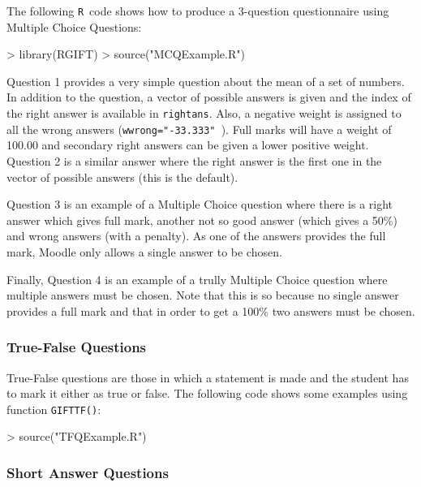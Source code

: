 \documentclass[a4paper]{article}
\newcommand{\RR}{\texttt{R}\ }
\newcommand{\code}[1]{\texttt{#1}}
\begin{document}
The following \RR code shows how to produce a 3-question questionnaire
using Multiple Choice Questions:



\begin{Schunk}
\begin{Sinput}
> library(RGIFT)
> source("MCQExample.R")
\end{Sinput}
\end{Schunk}

Question 1 provides a very simple question about the mean of a set of numbers.
In addition to the question, a vector of possible answers is given and the
index of the right answer is available in \code{rightans}. Also, a negative
weight is assigned to all the wrong answers (\code{wwrong="-33.333" }).
Full marks will have a weight of 100.00 and secondary right answers
can be given a lower positive weight.
Question 2 is a similar answer where the right answer is the first one in the
vector of possible answers (this is the default).  

Question 3 is an example of a Multiple Choice question where there is a right
answer which gives full mark, another not so good answer (which gives a 50\%)
and wrong answers (with a penalty).  As one of the answers provides the full
mark, Moodle only allows a single answer to be chosen.

Finally, Question 4 is an example of a trully Multiple Choice question where
multiple answers must be chosen. Note that this is so because no single answer
provides a full mark and that in order to get a 100\% two answers must be
chosen.

\subsubsection{True-False Questions}

True-False questions are those in which a statement is made and the student has
to mark it either as true or false. The following code shows some examples
using function \code{GIFTTF()}:


\begin{Schunk}
\begin{Sinput}
> source("TFQExample.R")
\end{Sinput}
\end{Schunk}


\subsubsection{Short Answer Questions}
\end{document}
